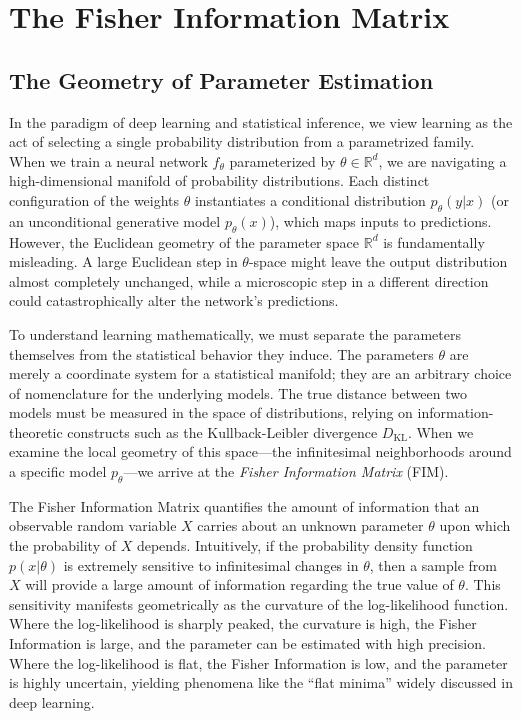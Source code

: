 \chapter{The Fisher Information Matrix}
\label{ch:fisher_info}

\section{The Geometry of Parameter Estimation}

In the paradigm of deep learning and statistical inference, we view learning as the act of selecting a single probability distribution from a parametrized family. When we train a neural network $f_\theta$ parameterized by $\theta \in \mathbb{R}^d$, we are navigating a high-dimensional manifold of probability distributions. Each distinct configuration of the weights $\theta$ instantiates a conditional distribution $p_\theta(y|x)$ (or an unconditional generative model $p_\theta(x)$), which maps inputs to predictions. However, the Euclidean geometry of the parameter space $\mathbb{R}^d$ is fundamentally misleading. A large Euclidean step in $\theta$-space might leave the output distribution almost completely unchanged, while a microscopic step in a different direction could catastrophically alter the network's predictions.

To understand learning mathematically, we must separate the parameters themselves from the statistical behavior they induce. The parameters $\theta$ are merely a coordinate system for a statistical manifold; they are an arbitrary choice of nomenclature for the underlying models. The true distance between two models must be measured in the space of distributions, relying on information-theoretic constructs such as the Kullback-Leibler divergence $D_{\text{KL}}$. When we examine the local geometry of this space---the infinitesimal neighborhoods around a specific model $p_\theta$---we arrive at the \textit{Fisher Information Matrix} (FIM).

The Fisher Information Matrix quantifies the amount of information that an observable random variable $X$ carries about an unknown parameter $\theta$ upon which the probability of $X$ depends. Intuitively, if the probability density function $p(x|\theta)$ is extremely sensitive to infinitesimal changes in $\theta$, then a sample from $X$ will provide a large amount of information regarding the true value of $\theta$. This sensitivity manifests geometrically as the curvature of the log-likelihood function. Where the log-likelihood is sharply peaked, the curvature is high, the Fisher Information is large, and the parameter can be estimated with high precision. Where the log-likelihood is flat, the Fisher Information is low, and the parameter is highly uncertain, yielding phenomena like the ``flat minima'' widely discussed in deep learning.

